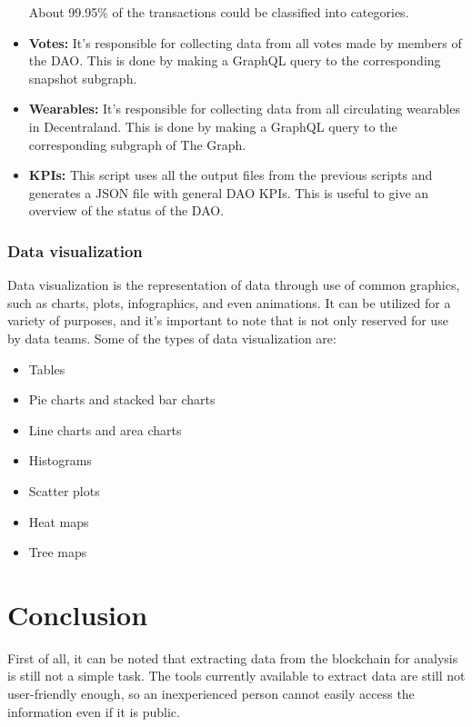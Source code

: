 \documentclass[MSE,Master,english]{twbook}%
\begin{document}
\begin{itemize}
  About 99.95\% of the transactions could be classified into categories.
  \item \textbf{Votes:} It's responsible for collecting data from all votes made by members of the DAO. This is done by making a GraphQL query to the corresponding snapshot subgraph.
  \item \textbf{Wearables:} It's responsible for collecting data from all circulating wearables in Decentraland. This is done by making a GraphQL query to the corresponding subgraph of The Graph.
  \item \textbf{KPIs:} This script uses all the output files from the previous scripts and generates a JSON file with general DAO KPIs. This is useful to give an overview of the status of the DAO.
\end{itemize}

\subsubsection{Data visualization}
Data visualization is the representation of data through use of common graphics, such as charts, plots, infographics, and even animations. It can be utilized for a variety of purposes, and it's important to note that is not only reserved for use by data teams. Some of the types of data visualization are:

\begin{multicols}{2}
  \begin{itemize}
    \item Tables
    \item Pie charts and stacked bar charts
    \item Line charts and area charts
    \item Histograms
    \item Scatter plots
    \item Heat maps
    \item Tree maps
  \end{itemize}
\end{multicols}

\section{Conclusion}
First of all, it can be noted that extracting data from the blockchain for analysis is still not a simple task. The tools currently available to extract data are still not user-friendly enough, so an inexperienced person cannot easily access the information even if it is public.
\end{document}

